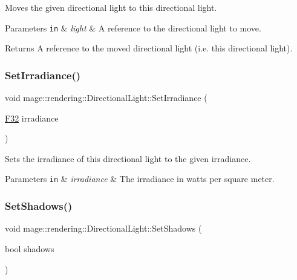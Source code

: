 Moves the given directional light to this directional light.


\begin{DoxyParams}[1]{Parameters}
\mbox{\tt in}  & {\em light} & A reference to the directional light to move. \\
\hline
\end{DoxyParams}
\begin{DoxyReturn}{Returns}
A reference to the moved directional light (i.\+e. this directional light). 
\end{DoxyReturn}
\mbox{\label{classmage_1_1rendering_1_1_directional_light_af8570b18bfb807492317e4a98f5c7ba6}} 
\subsubsection{\texorpdfstring{Set\+Irradiance()}{SetIrradiance()}}
{\footnotesize\ttfamily void mage\+::rendering\+::\+Directional\+Light\+::\+Set\+Irradiance (\begin{DoxyParamCaption}\item[{\mbox{\hyperlink{namespacemage_aa97e833b45f06d60a0a9c4fc22ae02c0}{F32}}}]{irradiance }\end{DoxyParamCaption})\hspace{0.3cm}{\ttfamily [noexcept]}}

Sets the irradiance of this directional light to the given irradiance.


\begin{DoxyParams}[1]{Parameters}
\mbox{\tt in}  & {\em irradiance} & The irradiance in watts per square meter. \\
\hline
\end{DoxyParams}
\mbox{\label{classmage_1_1rendering_1_1_directional_light_a4a8aa135c9366993f6343b33cd4ed9e0}} 
\subsubsection{\texorpdfstring{Set\+Shadows()}{SetShadows()}}
{\footnotesize\ttfamily void mage\+::rendering\+::\+Directional\+Light\+::\+Set\+Shadows (\begin{DoxyParamCaption}\item[{bool}]{shadows }\end{DoxyParamCaption})\hspace{0.3cm}{\ttfamily [noexcept]}}

